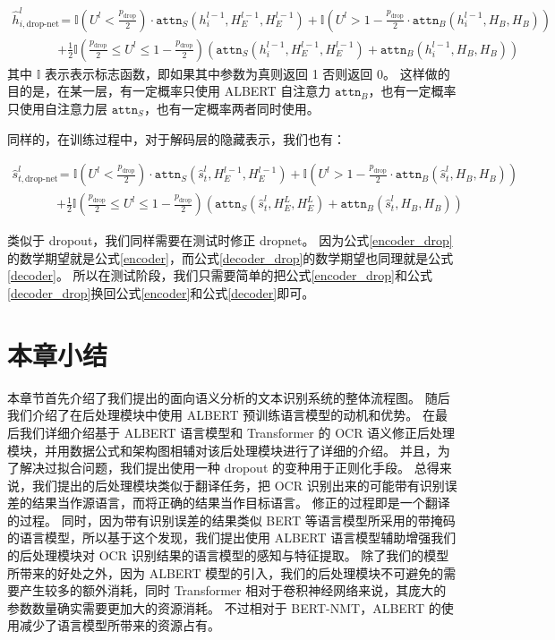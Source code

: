 \begin{align}
	\label{encoder_drop}
	\hat{h}_{i,\text{drop-net}}^l &= \mathbb{I}(U^l < \frac{p_{\text{drop}}}{2}) \cdot \texttt{attn}_S(h^{l-1}_i, H_E^{l-1}, H_E^{l-1}) + \mathbb{I}(U^l > 1 - \frac{p_{\text{drop}}}{2} \cdot \texttt{attn}_B(h_i^{l-1}, H_B, H_B)) \nonumber \\
	&+ \frac{1}{2} \mathbb{I}(\frac{p_{\text{drop}}}{2} \le U^l \le 1 - \frac{p_{\text{drop}}}{2}) (\texttt{attn}_S(h^{l-1}_i, H_E^{l-1}, H_E^{l-1}) + \texttt{attn}_B(h_i^{l-1}, H_B, H_B))
\end{align}
其中 $\mathbb{I}$ 表示表示标志函数，即如果其中参数为真则返回 1 否则返回 0。
这样做的目的是，在某一层，有一定概率只使用 ALBERT 自注意力 $\texttt{attn}_B$，也有一定概率只使用自注意力层 $\texttt{attn}_S$，也有一定概率两者同时使用。

同样的，在训练过程中，对于解码层的隐藏表示，我们也有：

\begin{align}
	\label{decoder_drop}
	\hat{s}^l_{t,\text{drop-net}} &=\mathbb{I}(U^l < \frac{p_{\text{drop}}}{2}) \cdot \texttt{attn}_S(\hat{s}_t^{l}, H_E^{l-1}, H_E^{l-1}) + \mathbb{I}(U^l > 1 - \frac{p_{\text{drop}}}{2} \cdot \texttt{attn}_B(\hat{s}_t^{l}, H_B, H_B)) \nonumber \\
	&+ \frac{1}{2} \mathbb{I}(\frac{p_{\text{drop}}}{2} \le U^l \le 1 - \frac{p_{\text{drop}}}{2}) (\texttt{attn}_S(\hat{s}_t^{l}, H_E^{L}, H_E^{L}) + \texttt{attn}_B(\hat{s}_t^{l}, H_B, H_B))
\end{align}

类似于 dropout，我们同样需要在测试时修正 dropnet。
因为公式\ref{encoder_drop}的数学期望就是公式\ref{encoder}，而公式\ref{decoder_drop}的数学期望也同理就是公式\ref{decoder}。
所以在测试阶段，我们只需要简单的把公式\ref{encoder_drop}和公式\ref{decoder_drop}换回公式\ref{encoder}和公式\ref{decoder}即可。

\section{本章小结}
\label{conclusion_bert_ocr}
本章节首先介绍了我们提出的面向语义分析的文本识别系统的整体流程图。
随后我们介绍了在后处理模块中使用 ALBERT 预训练语言模型的动机和优势。
在最后我们详细介绍基于 ALBERT 语言模型和 Transformer 的 OCR 语义修正后处理模块，并用数据公式和架构图相辅对该后处理模块进行了详细的介绍。
并且，为了解决过拟合问题，我们提出使用一种 dropout 的变种用于正则化手段。
总得来说，我们提出的后处理模块类似于翻译任务，把 OCR 识别出来的可能带有识别误差的结果当作源语言，而将正确的结果当作目标语言。
修正的过程即是一个翻译的过程。
同时，因为带有识别误差的结果类似 BERT\cite{bert} 等语言模型所采用的带掩码的语言模型，所以基于这个发现，我们提出使用 ALBERT\cite{albert} 语言模型辅助增强我们的后处理模块对 OCR 识别结果的语言模型的感知与特征提取。
除了我们的模型所带来的好处之外，因为 ALBERT 模型的引入，我们的后处理模块不可避免的需要产生较多的额外消耗，同时 Transformer 相对于卷积神经网络来说，其庞大的参数数量确实需要更加大的资源消耗。
不过相对于 BERT-NMT\cite{bert_nmt}，ALBERT 的使用减少了语言模型所带来的资源占有。

